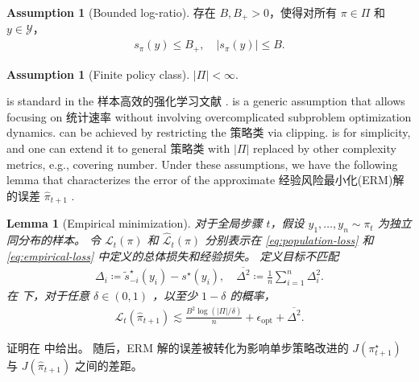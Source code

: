 \documentclass{article}
\theoremstyle{plain}
\newtheorem{lemma}[theorem]{Lemma}
\theoremstyle{definition}
\newtheorem{assumption}[theorem]{Assumption}
\theoremstyle{remark}
\newcommand{\abs}[1]{\left|#1\right|}
\begin{document}
\begin{assumption}[Bounded log-ratio]
\label{asm:bounded_logratio}
    存在 $B,B_+>0$，使得对所有 $\pi\in\Pi$ 和 $y\in\mathcal{Y}$，
    \begin{align}
        s_\pi(y)\leq B_+,
        \quad
        \abs{s_\pi(y)}\leq B.
        \label{eq:bounded_logratio_conv}
    \end{align}
\end{assumption}

\begin{assumption}[Finite policy class]
\label{asm:finite_class}
    $\abs{\Pi}<\infty$.
\end{assumption}

 is standard in the 样本高效的强化学习文献 \citep{foster2023foundations}. 
 is a generic assumption that allows focusing on 统计速率 without involving overcomplicated subproblem optimization dynamics.
 can be achieved by restricting the 策略类 via clipping. 
 is for simplicity, and one can extend it to general 策略类 with $\abs{\Pi}$ replaced by other complexity metrics, e.g., covering number.  
Under these assumptions, we have the following lemma that characterizes the error of the approximate 经验风险最小化(ERM)解的误差 $\widehat{\pi}_{t+1}$ . 
\begin{lemma}[Empirical minimization]\label{thm:erm_loo}
    对于全局步骤 $t$，假设 $y_1,\dots,y_n\sim\pi_t$ 为独立同分布的样本。  
令 $\mathcal{L}_t(\pi)$ 和 $\widehat{\mathcal{L}}_t(\pi)$ 分别表示在 \eqref{eq:population-loss} 和 \eqref{eq:empirical-loss} 中定义的总体损失和经验损失。  
定义目标不匹配
    \begin{align*}
        \Delta_i \coloneqq \widetilde{s}^\star_{-i}(y_i)-s^\star(y_i),
        \quad
        \overline{\Delta^2}\coloneqq \frac{1}{n}\sum_{i=1}^n \Delta_i^2.
    \end{align*}
    在  下，对于任意 $\delta\in(0,1)$ ，以至少 $1-\delta$ 的概率，
    \begin{align}
    \label{eq:erm_master_bound}
        \mathcal{L}_t(\widehat{\pi}_{t+1})
        \lesssim
        \frac{B^2\log(\abs{\Pi}/\delta)}{n} + \epsilon_{\mathrm{opt}} + \overline{\Delta^2}.
    \end{align}
\end{lemma}
证明在  中给出。  
随后，ERM 解的误差被转化为影响单步策略改进的 $J(\pi^\star_{t+1})$ 与 $J(\widehat{\pi}_{t+1})$ 之间的差距。 
\end{document}
